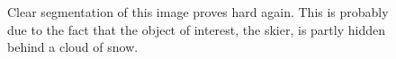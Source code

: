 \documentclass[11pt,a4paper]{article}
\begin{document}
\begin{figure}
\centering
{}
\quad
{}

\caption{Clear segmentation of this image proves hard again. This is probably due to the fact that the object of interest, the skier, is partly hidden behind a cloud of snow.}%

\end{figure}
\end{document}

